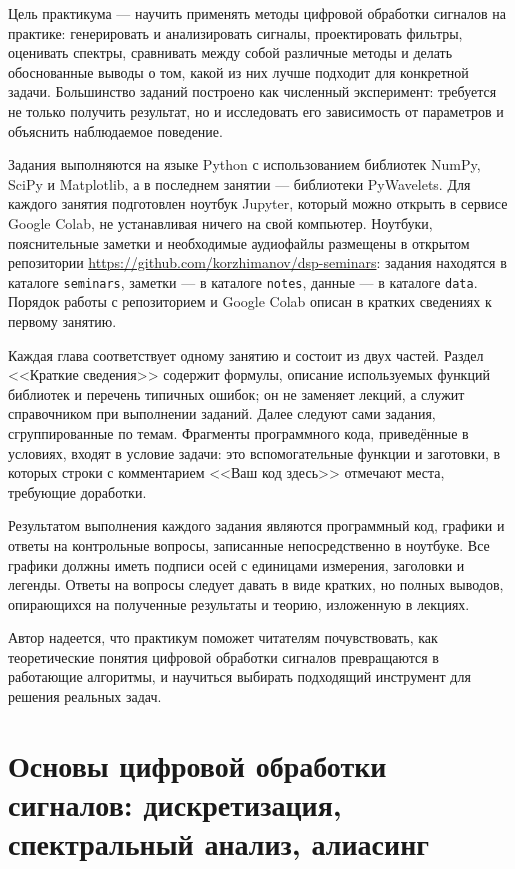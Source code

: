\documentclass[12pt,a4paper,openany]{book}
\begin{document}
Цель практикума --- научить применять методы цифровой обработки сигналов на практике: генерировать и анализировать сигналы, проектировать фильтры, оценивать спектры, сравнивать между собой различные методы и делать обоснованные выводы о том, какой из них лучше подходит для конкретной задачи. Большинство заданий построено как численный эксперимент: требуется не только получить результат, но и исследовать его зависимость от параметров и объяснить наблюдаемое поведение.

Задания выполняются на языке Python с использованием библиотек NumPy, SciPy и Matplotlib, а в последнем занятии --- библиотеки PyWavelets. Для каждого занятия подготовлен ноутбук Jupyter, который можно открыть в сервисе Google Colab, не устанавливая ничего на свой компьютер. Ноутбуки, пояснительные заметки и необходимые аудиофайлы размещены в открытом репозитории \url{https://github.com/korzhimanov/dsp-seminars}: задания находятся в каталоге \texttt{seminars}, заметки --- в каталоге \texttt{notes}, данные --- в каталоге \texttt{data}. Порядок работы с репозиторием и Google Colab описан в кратких сведениях к первому занятию.

Каждая глава соответствует одному занятию и состоит из двух частей. Раздел <<Краткие сведения>> содержит формулы, описание используемых функций библиотек и перечень типичных ошибок; он не заменяет лекций, а служит справочником при выполнении заданий. Далее следуют сами задания, сгруппированные по темам. Фрагменты программного кода, приведённые в условиях, входят в условие задачи: это вспомогательные функции и заготовки, в которых строки с комментарием <<Ваш код здесь>> отмечают места, требующие доработки.

Результатом выполнения каждого задания являются программный код, графики и ответы на контрольные вопросы, записанные непосредственно в ноутбуке. Все графики должны иметь подписи осей с единицами измерения, заголовки и легенды. Ответы на вопросы следует давать в виде кратких, но полных выводов, опирающихся на полученные результаты и теорию, изложенную в лекциях.

Автор надеется, что практикум поможет читателям почувствовать, как теоретические понятия цифровой обработки сигналов превращаются в работающие алгоритмы, и научиться выбирать подходящий инструмент для решения реальных задач.

\chapter{Основы цифровой обработки сигналов: дискретизация, спектральный анализ, алиасинг}
\end{document}

